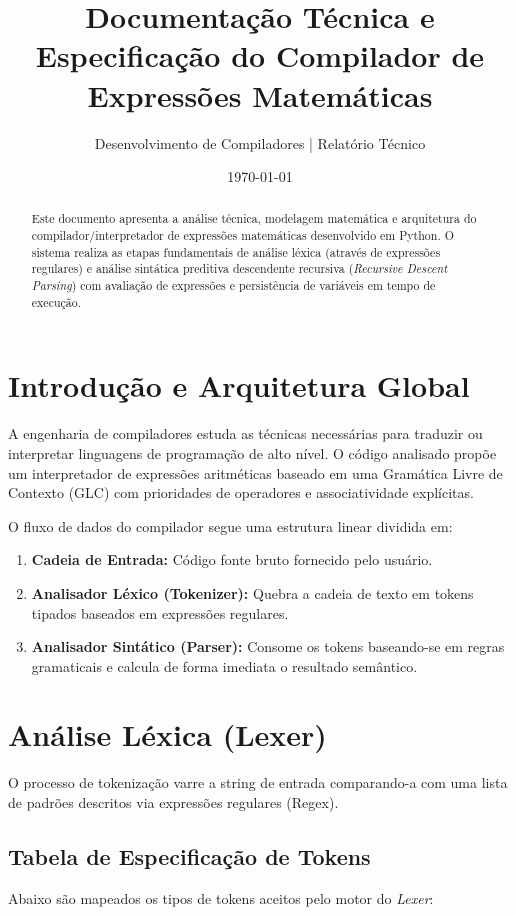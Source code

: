 \documentclass[12pt,a4paper]{article}
\title{\textbf{Documentação Técnica e Especificação do Compilador de Expressões Matemáticas}}
\author{Desenvolvimento de Compiladores | Relatório Técnico}
\date{\today}
\begin{document}
\maketitle

\begin{abstract}
Este documento apresenta a análise técnica, modelagem matemática e arquitetura do compilador/interpretador de expressões matemáticas desenvolvido em Python. O sistema realiza as etapas fundamentais de análise léxica (através de expressões regulares) e análise sintática preditiva descendente recursiva (\textit{Recursive Descent Parsing}) com avaliação de expressões e persistência de variáveis em tempo de execução.
\end{abstract}

\tableofcontents
\newpage

\section{Introdução e Arquitetura Global}
A engenharia de compiladores estuda as técnicas necessárias para traduzir ou interpretar linguagens de programação de alto nível. O código analisado propõe um interpretador de expressões aritméticas baseado em uma Gramática Livre de Contexto (GLC) com prioridades de operadores e associatividade explícitas.

O fluxo de dados do compilador segue uma estrutura linear dividida em:
\begin{enumerate}
    \item \textbf{Cadeia de Entrada:} Código fonte bruto fornecido pelo usuário.
    \item \textbf{Analisador Léxico (Tokenizer):} Quebra a cadeia de texto em tokens tipados baseados em expressões regulares.
    \item \textbf{Analisador Sintático (Parser):} Consome os tokens baseando-se em regras gramaticais e calcula de forma imediata o resultado semântico.
\end{enumerate}

\section{Análise Léxica (Lexer)}
O processo de tokenização varre a string de entrada comparando-a com uma lista de padrões descritos via expressões regulares (Regex). 

\subsection{Tabela de Especificação de Tokens}
Abaixo são mapeados os tipos de tokens aceitos pelo motor do \textit{Lexer}:
\end{document}
